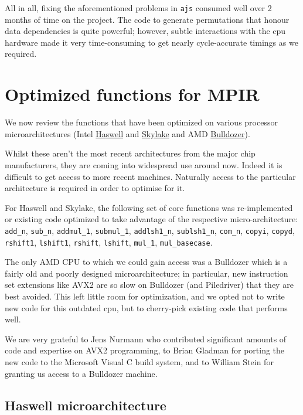 All in all, fixing the aforementioned problems in \texttt{ajs} consumed
well over 2 months of time on the project. The code to generate
permutations that honour data dependencies is quite powerful; however,
subtle interactions with the cpu hardware made it very time-consuming to
get nearly cycle-accurate timings as we required.

\section*{Optimized functions for
MPIR}\label{optimized-functions-for-mpir}

We now review the functions that have been optimized on various
processor microarchitectures (Intel
\href{https://en.wikipedia.org/wiki/Haswell_(microarchitecture)}{Haswell}
and
\href{https://en.wikipedia.org/wiki/Skylake_(microarchitecture)}{Skylake}
and AMD
\href{https://en.wikipedia.org/wiki/Bulldozer_(microarchitecture)}{Bulldozer}).

Whilst these aren't the most recent architectures from the major chip
manufacturers, they are coming into widespread use around now. Indeed it
is difficult to get access to more recent machines. Naturally access to
the particular architecture is required in order to optimise for it.

For Haswell and Skylake, the following set of core functions was
re-implemented or existing code optimized to take advantage of the
respective micro-architecture: \texttt{add\_n}, \texttt{sub\_n},
\texttt{addmul\_1}, \texttt{submul\_1}, \texttt{addlsh1\_n},
\texttt{sublsh1\_n}, \texttt{com\_n}, \texttt{copyi}, \texttt{copyd},
\texttt{rshift1}, \texttt{lshift1}, \texttt{rshift}, \texttt{lshift},
\texttt{mul\_1}, \texttt{mul\_basecase}.

The only AMD CPU to which we could gain access was a Bulldozer which is
a fairly old and poorly designed microarchitecture; in particular, new
instruction set extensions like AVX2 are so slow on Bulldozer (and
Piledriver) that they are best avoided. This left little room for
optimization, and we opted not to write new code for this outdated cpu,
but to cherry-pick existing code that performs well.

We are very grateful to Jens Nurmann who contributed significant amounts
of code and expertise on AVX2 programming, to Brian Gladman for porting
the new code to the Microsoft Visual C build system, and to William
Stein for granting us access to a Bulldozer machine.

\subsection{Haswell microarchitecture}\label{haswell-microarchitecture}

